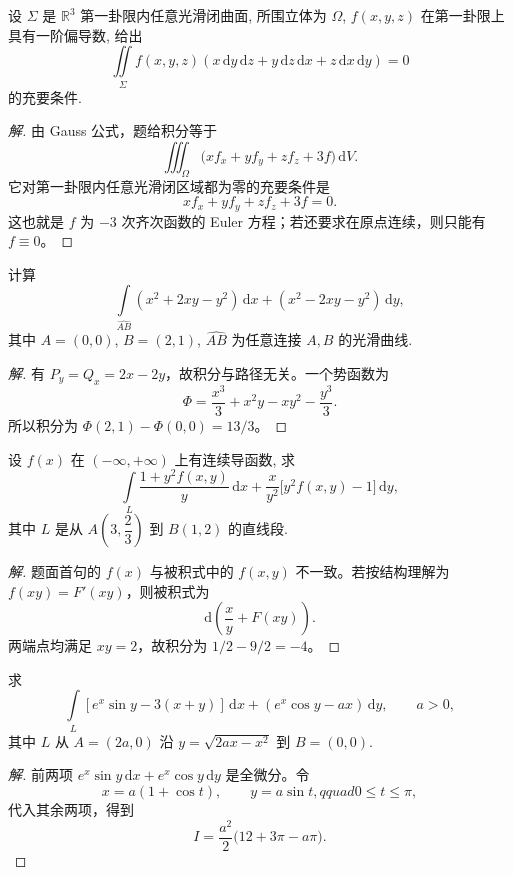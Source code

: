 \documentclass[../../数学分析培优讲义(答案版).tex]{subfiles}
\begin{document}
\begin{example}
设 $\Sigma$ 是 $\mathbb{R}^3$ 第一卦限内任意光滑闭曲面, 所围立体为 $\Omega$, $f(x,y,z)$ 在第一卦限上具有一阶偏导数, 给出
\[
    \iint\limits_\Sigma f(x,y,z)(x\,\mathrm{d}y\,\mathrm{d}z+y\,\mathrm{d}z\,\mathrm{d}x+z\,\mathrm{d}x\,\mathrm{d}y)=0
\]
的充要条件.
\end{example}

\begin{proof}[解]
由 Gauss 公式，题给积分等于
\[
\iiint_\Omega\bigl(xf_x+yf_y+zf_z+3f\bigr)\,\mathrm{d}V.
\]
它对第一卦限内任意光滑闭区域都为零的充要条件是
\[
xf_x+yf_y+zf_z+3f=0.
\]
这也就是 $f$ 为 $-3$ 次齐次函数的 Euler 方程；若还要求在原点连续，则只能有 $f\equiv0$。
\end{proof}


\begin{example}
计算
\[
    \int\limits_{\widehat{AB}}(x^2+2xy-y^2)\,\mathrm{d}x+(x^2-2xy-y^2)\,\mathrm{d}y,
\]
其中 $A=(0,0)$, $B=(2,1)$, $\widehat{AB}$ 为任意连接 $A,B$ 的光滑曲线.
\end{example}

\begin{proof}[解]
有 $P_y=Q_x=2x-2y$，故积分与路径无关。一个势函数为
\[
\Phi=\dfrac{x^3}{3}+x^2y-xy^2-\dfrac{y^3}{3}.
\]
所以积分为 $\Phi(2,1)-\Phi(0,0)=13/3$。
\end{proof}

\begin{example}
设 $f(x)$ 在 $(-\infty,+\infty)$ 上有连续导函数, 求
\[
    \int\limits_L
    \dfrac{1+y^2f(x,y)}{y}\,\mathrm{d}x
    +\dfrac{x}{y^2}\bigl\lbrack y^2f(x,y)-1\bigr\rbrack\,\mathrm{d}y,
\]
其中 $L$ 是从 $A(3,\dfrac{2}{3})$ 到 $B(1,2)$ 的直线段.
\end{example}

\begin{proof}[解]
题面首句的 $f(x)$ 与被积式中的 $f(x,y)$ 不一致。若按结构理解为 $f(xy)=F'(xy)$，则被积式为
\[
\mathrm{d}\left(\dfrac{x}{y}+F(xy)\right).
\]
两端点均满足 $xy=2$，故积分为 $1/2-9/2=-4$。
\end{proof}

\begin{example}
求
\[
    \int\limits_L[ e^x\sin y-3(x+y)]\,\mathrm{d}x+(e^x\cos y-ax)\,\mathrm{d}y,
    \qquad a>0,
\]
其中 $L$ 从 $A=(2a,0)$ 沿 $y=\sqrt{2ax-x^2}$ 到 $B=(0,0)$.
\end{example}

\begin{proof}[解]
前两项 $e^x\sin y\,\mathrm{d}x+e^x\cos y\,\mathrm{d}y$ 是全微分。令
\[
x=a(1+\cos t),\qquad y=a\sin t,qquad0\leq t\leq\pi,
\]
代入其余两项，得到
\[
I=\dfrac{a^2}{2}\bigl(12+3\pi-a\pi\bigr).
\]
\end{proof}
\end{document}
